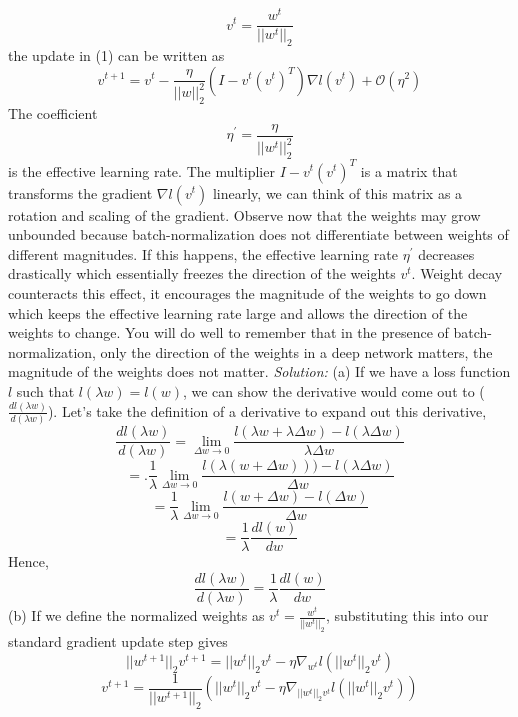\documentclass[12pt]{article}
\begin{document}
$$ v^{t}  = \frac{w^{t}}{|| w^{t} ||_{2} }   $$
the update in (1) can be written as 
$$v^{t+1}  =  v^{t} - \frac{\eta}{||w||_{2}^{2}}( I - v^{t}(v^{t})^{T}) \nabla l (v^{t})   + \mathcal{O}  (\eta^{2})  $$
The coefficient 
$$\eta^{\prime}  = \frac{\eta}{|| w^{t} ||_{2}^{2} }  $$
is the effective learning rate. The multiplier $I -  v^{t}(v^{t})^{T}$ is a matrix that transforms the gradient $\nabla l (v^{t})$   linearly, we can think of this matrix as a rotation and scaling of the gradient. \newline 
Observe now that the weights may grow unbounded because batch-normalization does not differentiate between weights of different magnitudes.  If this happens, the effective learning rate $\eta^{\prime}$ decreases  drastically which essentially freezes the direction of the weights $v^{t}$. Weight decay counteracts this effect, it encourages the magnitude of the weights to go down which keeps the effective learning rate large and allows the direction of the weights to change. You will do well to remember that in the presence of batch-normalization, only the direction of the weights in a deep network matters, the magnitude of the weights does not matter. \newline \newline 
\emph{Solution: } \newline   \newline 
(a) If we have a loss function $l$ such that $l(\lambda w) = l(w)$, we can show the derivative would come out to ($\frac{ dl(\lambda  w) }{d (\lambda w )}$).  Let's take the definition of a derivative to expand out this derivative, 
$$ \frac{ dl(\lambda  w) }{d (\lambda w )} = \lim_{\Delta w \rightarrow 0}  \frac{ l (\lambda  w + \lambda \Delta w )  - l (\lambda \Delta w )}{  \lambda \Delta w}   $$
$$ =.  \frac{1}{\lambda}   \lim_{\Delta w \rightarrow 0}    \frac{ l (\lambda  (w + \Delta w)) )  - l (\lambda \Delta w )}{ \Delta w}  $$
$$=   \frac{1}{\lambda}   \lim_{\Delta w \rightarrow 0}    \frac{ l ( w + \Delta w )  - l (\Delta w )}{ \Delta w}  $$
$$ =  \frac{1}{\lambda} \frac{ dl( w) }{d  w  }     $$ 
Hence, 
$$ \frac{ dl(\lambda  w) }{d (\lambda w )} =  \frac{1}{\lambda} \frac{ dl( w) }{d  w  }     $$
\newline \newline 
(b) If we define the normalized weights as $v^{t} = \frac{w^t}{||w^t||_2} $, substituting this into our standard gradient update step gives 
$$ ||w^{t+1}||_2 v^{t+1}  = ||w^{t}||_2 v^{t}  -  \eta \nabla_{w^t} l (||w^{t}||_2 v^{t})  $$
$$v^{t+1}  = \frac{1}{||w^{t+1}||_2} (  ||w^{t}||_2 v^{t}  - \eta  \nabla_{||w^{t}||_2 v^{t} } l (||w^{t}||_2 v^{t} )   )   $$
\end{document}
